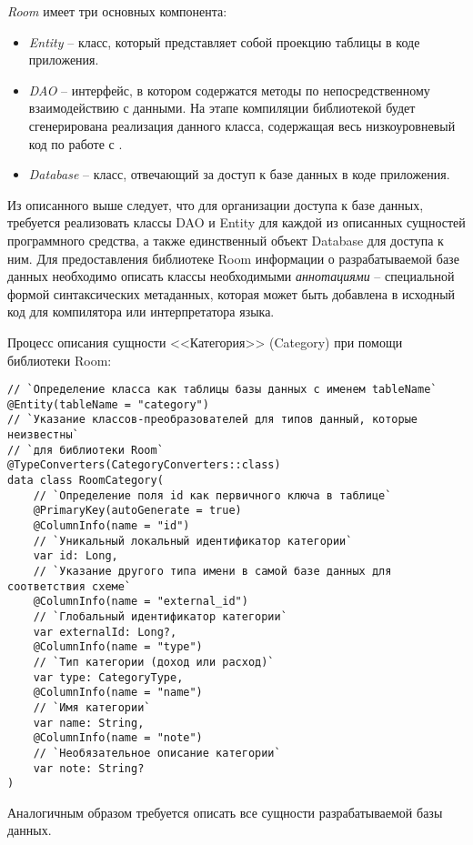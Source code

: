 \emph{Room} имеет три основных компонента:
\begin{itemize}
    \item \emph{Entity} -- класс, который представляет собой проекцию таблицы \sqlite в коде приложения.
    \item \emph{DAO} -- интерфейс, в котором содержатся методы по непосредственному взаимодействию с данными.
    На этапе компиляции библиотекой будет сгенерирована реализация данного класса, содержащая весь низкоуровневый код по работе с \sqlite.
    \item \emph{Database} -- класс, отвечающий за доступ к базе данных в коде приложения.
\end{itemize}

Из описанного выше следует, что для организации доступа к базе данных, требуется реализовать классы DAO и Entity для каждой из описанных сущностей программного средства, а также единственный объект Database для доступа к ним.
Для предоставления библиотеке Room информации о разрабатываемой базе данных необходимо описать классы необходимыми \emph{аннотациями} -- специальной формой синтаксических метаданных, которая может быть добавлена в исходный код для компилятора или интерпретатора языка.

Процесс описания сущности <<Категория>> (Category) при помощи библиотеки Room:

\begin{lstlisting}[style=standard]
// `Определение класса как таблицы базы данных с именем tableName`
@Entity(tableName = "category")
// `Указание классов-преобразователей для типов данный, которые неизвестны`
// `для библиотеки Room`
@TypeConverters(CategoryConverters::class)
data class RoomCategory(
    // `Определение поля id как первичного ключа в таблице`
    @PrimaryKey(autoGenerate = true)
    @ColumnInfo(name = "id")
    // `Уникальный локальный идентификатор категории`
    var id: Long,
    // `Указание другого типа имени в самой базе данных для соответствия схеме`
    @ColumnInfo(name = "external_id")
    // `Глобальный идентификатор категории`
    var externalId: Long?,
    @ColumnInfo(name = "type")
    // `Тип категории (доход или расход)`
    var type: CategoryType,
    @ColumnInfo(name = "name")
    // `Имя категории`
    var name: String,
    @ColumnInfo(name = "note")
    // `Необязательное описание категории`
    var note: String?
)
\end{lstlisting}

Аналогичным образом требуется описать все сущности разрабатываемой базы данных.

